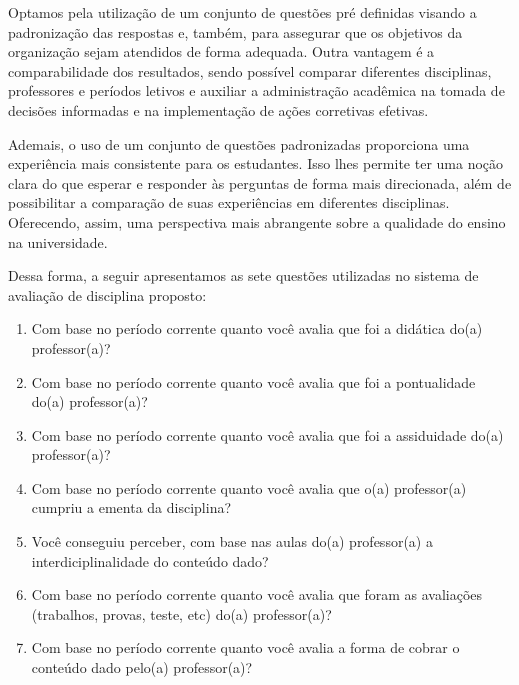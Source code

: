 Optamos pela utilização de um conjunto de questões pré definidas visando a padronização das respostas e, também, para assegurar que os objetivos da organização sejam atendidos de forma adequada. Outra vantagem é a comparabilidade dos resultados, sendo possível comparar diferentes disciplinas, professores e períodos letivos e auxiliar a administração acadêmica na tomada de decisões informadas e na implementação de ações corretivas efetivas.

Ademais, o uso de um conjunto de questões padronizadas proporciona uma experiência mais consistente para os estudantes. Isso lhes permite ter uma noção clara do que esperar e responder às perguntas de forma mais direcionada, além de possibilitar a comparação de suas experiências em diferentes disciplinas. Oferecendo, assim, uma perspectiva mais abrangente sobre a qualidade do ensino na universidade.

Dessa forma, a seguir apresentamos as sete questões utilizadas no sistema de avaliação de disciplina proposto:




\begin{enumerate}
\item Com base no período corrente quanto você avalia que foi a didática do(a) professor(a)?
\item Com base no período corrente quanto você avalia que foi a pontualidade do(a) professor(a)?
\item Com base no período corrente quanto você avalia que foi a assiduidade do(a) professor(a)?
\item Com base no período corrente quanto você avalia que o(a) professor(a) cumpriu a ementa da disciplina?
\item Você conseguiu perceber, com base nas aulas do(a) professor(a) a interdiciplinalidade do conteúdo dado?
\item Com base no período corrente quanto você avalia que foram as avaliações (trabalhos, provas, teste, etc) do(a) professor(a)?
\item Com base no período corrente quanto você avalia a forma de cobrar o conteúdo dado pelo(a) professor(a)?
\end{enumerate}

